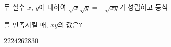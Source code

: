 두 실수 $x$, $y$에 대하여 $\sqrt{x}\sqrt{y}=-\sqrt{xy}$가 성립하고 등식\par\smallskip{}\par\smallskip\noindent 를 만족시킬 때, $xy$의 값은?
\begin{choices32}{$22$}{$24$}{$26$}{$28$}{$30$}\end{choices32}
